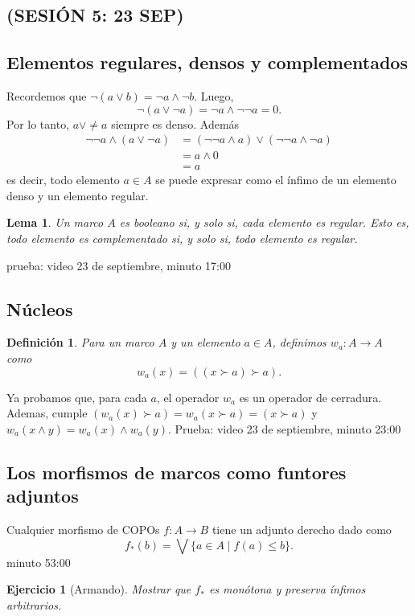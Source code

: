 \documentclass[12pt,letterpaper,titlepage]{article}
\newtheorem*{defn}{Definición}
\newtheorem{exe}{Ejercicio}
\newtheorem*{lemma}{Lema}
\theoremstyle{definition}
\renewcommand\sup{\vee}
\newcommand\Sup{\bigvee}
\renewcommand\inf{\wedge}
\newcommand\<{\langle}
\renewcommand\>{\rangle}
\begin{document}
\subsection*{(SESIÓN 5: 23 SEP)}

\subsection{Elementos regulares, densos y complementados}

Recordemos que $\neg(a\sup b)=\neg a\inf \neg b$.
Luego,
\[
  \neg(a\sup\neg a) = \neg a\inf\neg\neg a = 0
.\]
Por lo tanto, $a\sup\neq a$ siempre es denso.
Además
\begin{align*}
  \neg\neg a\inf(a\sup\neg a)
  &= (\neg\neg a\inf a)\sup(\neg\neg a\inf\neg a) \\
  &= a \inf 0 \\
  &= a
\end{align*}
es decir, todo elemento $a\in A$ se puede expresar como el ínfimo
de un elemento denso y un elemento regular.

\begin{lemma}
  Un marco $A$ es booleano si, y solo si, cada elemento es
  regular.
  Esto es, todo elemento es complementado si, y solo si, todo
  elemento es regular.
\end{lemma}
prueba: video 23 de septiembre, minuto 17:00

\subsection{Núcleos}

\begin{defn}
  Para un marco $A$ y un elemento $a\in A$, definimos $w_a:A\to
  A$ como
  \[
    w_a(x)=((x\succ a)\succ a)
  .\]
\end{defn}
Ya probamos que, para cada $a$, el operador $w_a$ es un operador
de cerradura.
Ademas, cumple $(w_a(x)\succ a) = w_a(x\succ a)=(x\succ a)$ y
$w_a(x\inf y) = w_a(x)\inf w_a(y)$.
Prueba: video 23 de septiembre, minuto 23:00

\subsection{Los morfismos de marcos como funtores adjuntos}

Cualquier morfismo de COPOs $f:A\to B$ tiene un
adjunto derecho dado como
\[
 f_*(b) = \Sup\{a\in A \mid f(a)\leq b\} 
.\]
minuto 53:00

\begin{exe}[Armando]
  Mostrar que $f_*$ es monótona y preserva ínfimos arbitrarios.
\end{exe}
\end{document}
